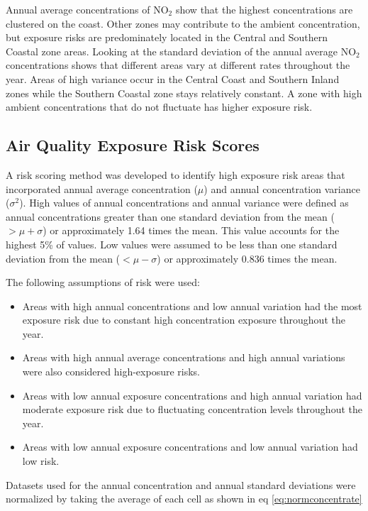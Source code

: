 Annual average concentrations of NO$_{2}$ show that the highest concentrations are clustered on the coast. Other zones may contribute to the ambient concentration, but exposure risks are predominately located in the Central and Southern Coastal zone areas.  Looking at the standard deviation of the annual average NO$_{2}$ concentrations shows that different areas vary at different rates throughout the year. Areas of high variance occur in the Central Coast and Southern Inland zones while the Southern Coastal zone stays relatively constant.  A zone with high ambient concentrations that do not fluctuate has higher exposure risk. 

\subsection{Air Quality Exposure Risk Scores}

A risk scoring method was developed to identify high exposure risk areas that incorporated annual average concentration ($\mu$) and annual concentration variance ($\sigma^{2}$).  High values of annual concentrations and annual variance were defined as annual concentrations greater than one standard deviation from the mean ($> \mu + \sigma$) or approximately 1.64 times the mean. This value accounts for the highest 5\% of values. Low values were assumed to be less than one standard deviation from the mean ($< \mu - \sigma$) or approximately 0.836 times the mean.

The following assumptions of risk were used:
\begin{itemize}
\item Areas with high annual concentrations and low annual variation had the most exposure risk due to constant high concentration exposure throughout the year.
\item Areas with high annual average concentrations and high annual variations were also considered high-exposure risks.
\item Areas with low annual exposure concentrations and high annual variation had moderate exposure risk due to fluctuating concentration levels throughout the year.
\item Areas with low annual exposure concentrations and low annual variation had low risk.
\end{itemize}

Datasets used for the annual concentration and annual standard deviations were normalized by taking the average of each cell as shown in eq \ref{eq:normconcentrate}

